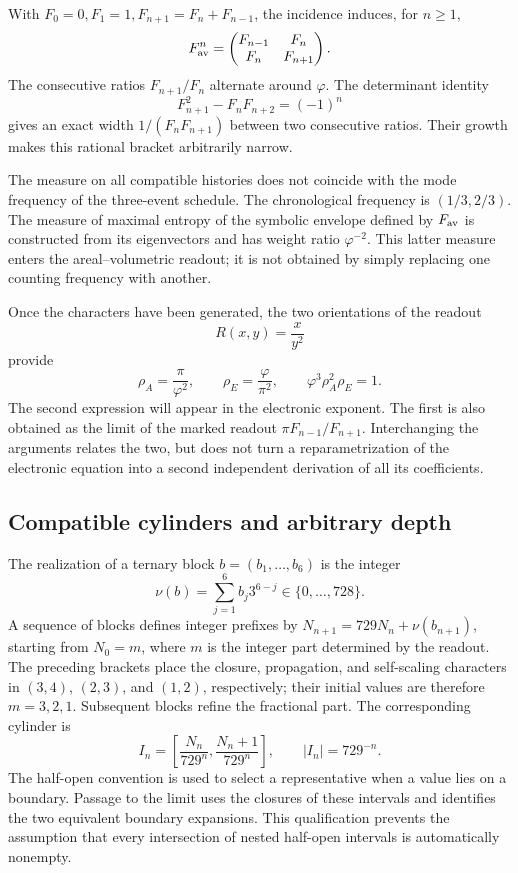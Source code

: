 With \(F_0=0,F_1=1,F_{n+1}=F_n+F_{n-1}\), the incidence induces, for \(n\geq1\),
\[
 F_{\rm av}^n=\begin{pmatrix}F_{n-1}&F_n\\F_n&F_{n+1}\end{pmatrix}.
\]
The consecutive ratios \(F_{n+1}/F_n\) alternate around \(\varphi\). The determinant identity
\[
 F_{n+1}^2-F_nF_{n+2}=(-1)^n
\]
gives an exact width \(1/(F_nF_{n+1})\) between two consecutive ratios. Their growth makes this rational bracket arbitrarily narrow.

The measure on all compatible histories does not coincide with the mode frequency of the three-event schedule. The chronological frequency is \((1/3,2/3)\). The measure of maximal entropy of the symbolic envelope defined by \(F_{\rm av}\) is constructed from its eigenvectors and has weight ratio \(\varphi^{-2}\). This latter measure enters the areal--volumetric readout; it is not obtained by simply replacing one counting frequency with another.



Once the characters have been generated, the two orientations of the readout
\[
 R(x,y)=\frac{x}{y^2}
\]
provide
\begin{equation}
 \rho_A=\frac\pi{\varphi^2},\qquad
 \rho_E=\frac\varphi{\pi^2},\qquad
 \varphi^3\rho_A^2\rho_E=1.
 \label{eq:areal-electron}
\end{equation}
The second expression will appear in the electronic exponent. The first is also obtained as the limit of the marked readout \(\pi F_{n-1}/F_{n+1}\). Interchanging the arguments relates the two, but does not turn a reparametrization of the electronic equation into a second independent derivation of all its coefficients.



\subsection{Compatible cylinders and arbitrary depth}

The realization of a ternary block \(b=(b_1,\ldots,b_6)\) is the integer
\[
 \nu(b)=\sum_{j=1}^6b_j3^{6-j}\in\{0,\ldots,728\}.
\]
A sequence of blocks defines integer prefixes by \(N_{n+1}=729N_n+\nu(b_{n+1})\), starting from \(N_0=m\), where \(m\) is the integer part determined by the readout. The preceding brackets place the closure, propagation, and self-scaling characters in \((3,4)\), \((2,3)\), and \((1,2)\), respectively; their initial values are therefore \(m=3,2,1\). Subsequent blocks refine the fractional part. The corresponding cylinder is
\begin{equation}
 I_n=\left[\frac{N_n}{729^n},\frac{N_n+1}{729^n}\right],
 \qquad |I_n|=729^{-n}.
 \label{eq:cilindro}
\end{equation}
The half-open convention is used to select a representative when a value lies on a boundary. Passage to the limit uses the closures of these intervals and identifies the two equivalent boundary expansions. This qualification prevents the assumption that every intersection of nested half-open intervals is automatically nonempty.

